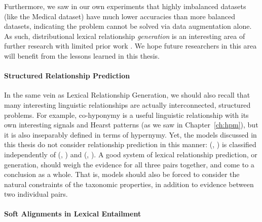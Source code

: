 Furthermore, we saw in our own experiments that highly imbalanced datasets
(like the Medical dataset) have much lower accuracies than more balanced
datasets, indicating the problem cannot be solved via data augmentation alone.
As such, distributional lexical relationship {\em generation} is an interesting
area of further research with limited prior work
\cite{fu:2014:acl,nayak:2015:techreport,espinosaanke:2016:emnlp}. We hope
future researchers in this area will benefit from the lessons learned in this
thesis.

\paragraph{Structured Relationship Prediction}

In the same vein as Lexical Relationship Generation, we should also recall that
many interesting linguistic relationships are actually interconnected,
structured problems. For example, co-hyponymy is a useful linguistic
relationship with its own interesting signals and Hearst patterns (as we saw in
Chapter~\ref{ch:hpm}), but it is also inseparably defined in terms of
hypernymy. Yet, the models discussed in this thesis do not consider relationship
prediction in this manner: (, ) is classified independently
of (, ) and (, ). A good system of
lexical relationship prediction, or generation, should weigh the evidence for
all three pairs together, and come to a conclusion as a whole. That is, models
should also be forced to consider the natural constraints of the taxonomic
properties, in addition to evidence between two individual pairs.

\paragraph{Soft Alignments in Lexical Entailment}


